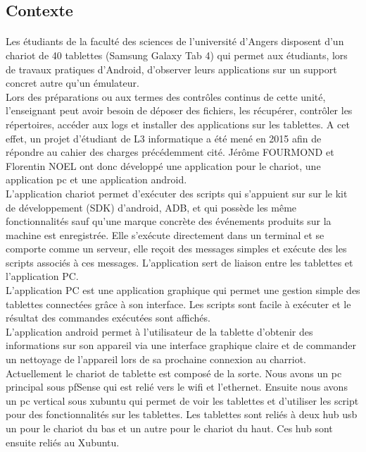 \documentclass[a4paper,12pt]{article}
\begin{document}
\subsection{Contexte}
\paragraph{}
Les étudiants de la faculté des sciences de l’université d’Angers disposent d’un chariot de 40 tablettes (Samsung Galaxy Tab 4) qui permet aux étudiants, lors de travaux pratiques d’Android, d’observer leurs applications sur un support concret autre qu’un émulateur.\\


Lors des préparations ou aux termes des contrôles continus de cette unité, l’enseignant peut avoir besoin de déposer des fichiers, les récupérer, contrôler les répertoires, accéder aux logs et installer des applications sur les tablettes.
A cet effet, un projet d’étudiant de L3 informatique a été mené en 2015 afin de répondre au cahier des charges précédemment cité. Jérôme FOURMOND et Florentin NOEL ont donc développé une application pour le chariot, une application pc et une application android.\\

L’application chariot permet d’exécuter des scripts qui s’appuient sur sur le kit de développement (SDK) d’android, ADB, et qui possède les même fonctionnalités sauf qu’une marque concrète des événements produits sur la machine est enregistrée.  Elle s'exécute directement dans un terminal et  se comporte comme un serveur, elle reçoit des messages simples et exécute des les scripts associés à ces messages. L’application sert de liaison entre les tablettes et l’application PC.\\

L’application PC est une application graphique qui permet une gestion simple des tablettes connectées grâce à son interface. Les scripts sont facile à exécuter et le résultat des commandes exécutées sont affichés. \\

L’application android permet à l’utilisateur de la tablette d’obtenir des informations sur son appareil via une interface graphique claire et de commander un nettoyage de l'appareil lors de sa prochaine connexion au charriot.\\

Actuellement le chariot de tablette est composé de la sorte. Nous avons un pc principal sous pfSense qui est relié vers le wifi et l’ethernet. Ensuite nous avons un pc vertical sous xubuntu qui permet de voir les tablettes et d’utiliser les script pour des fonctionnalités sur les tablettes. Les tablettes sont reliés à deux hub usb un pour le chariot du bas et un autre pour le chariot du haut. Ces hub sont ensuite reliés au Xubuntu.\\
\end{document}
